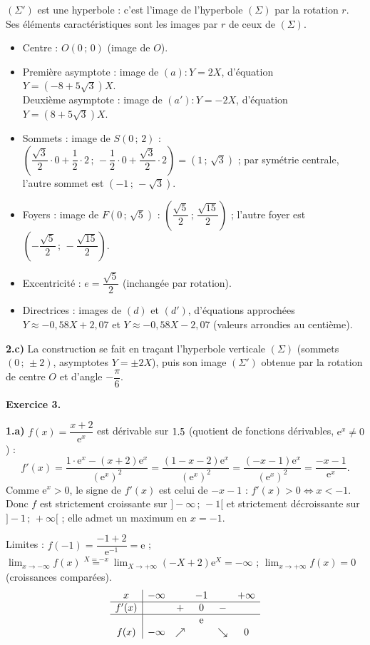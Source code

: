 \noindent$(\Sigma')$ est une hyperbole : c'est l'image de l'hyperbole $(\Sigma)$ par la rotation $r$. Ses éléments caractéristiques sont les images par $r$ de ceux de $(\Sigma)$.
\begin{itemize}
\item Centre : $O(0\,;\,0)$ (image de $O$).
\item Première asymptote : image de $(a):Y=2X$, d'équation $Y=(-8+5\sqrt3)X$.\\
Deuxième asymptote : image de $(a'):Y=-2X$, d'équation $Y=(8+5\sqrt3)X$.
\item Sommets : image de $S(0\,;\,2)$ : $\left(\dfrac{\sqrt3}{2}\cdot0+\dfrac12\cdot2\,;\,-\dfrac12\cdot0+\dfrac{\sqrt3}{2}\cdot2\right)=(1\,;\,\sqrt3)$ ; par symétrie centrale, l'autre sommet est $(-1\,;\,-\sqrt3)$.
\item Foyers : image de $F(0\,;\,\sqrt5)$ : $\left(\dfrac{\sqrt5}{2}\,;\,\dfrac{\sqrt{15}}{2}\right)$ ; l'autre foyer est $\left(-\dfrac{\sqrt5}{2}\,;\,-\dfrac{\sqrt{15}}{2}\right)$.
\item Excentricité : $e=\dfrac{\sqrt5}{2}$ (inchangée par rotation).
\item Directrices : images de $(d)$ et $(d')$, d'équations approchées $Y\approx-0{,}58X+2{,}07$ et $Y\approx-0{,}58X-2{,}07$ (valeurs arrondies au centième).
\end{itemize}

\noindent\textbf{2.c)} La construction se fait en traçant l'hyperbole verticale $(\Sigma)$ (sommets $(0\,;\,\pm2)$, asymptotes $Y=\pm2X$), puis son image $(\Sigma')$ obtenue par la rotation de centre $O$ et d'angle $-\dfrac{\pi}{6}$.

\bigskip
\noindent\textbf{Exercice 3.}

\smallskip
\noindent\textbf{1.a)} $f(x)=\dfrac{x+2}{\mathrm e^{x}}$ est dérivable sur $1.5$ (quotient de fonctions dérivables, $\mathrm e^{x}\neq0$) :
\[
f'(x)=\frac{1\cdot\mathrm e^{x}-(x+2)\mathrm e^{x}}{(\mathrm e^{x})^2}=\frac{(1-x-2)\mathrm e^{x}}{(\mathrm e^{x})^2}=\frac{(-x-1)\mathrm e^{x}}{(\mathrm e^{x})^2}=\frac{-x-1}{\mathrm e^{x}}.
\]
Comme $\mathrm e^{x}>0$, le signe de $f'(x)$ est celui de $-x-1$ : $f'(x)>0\iff x<-1$. Donc $f$ est strictement croissante sur $]-\infty\,;\,-1[$ et strictement décroissante sur $]-1\,;\,+\infty[$ ; elle admet un maximum en $x=-1$.

\noindent Limites : $f(-1)=\dfrac{-1+2}{\mathrm e^{-1}}=\mathrm e$ ; $\displaystyle\lim_{x\to-\infty}f(x)\overset{X=-x}{=}\lim_{X\to+\infty}(-X+2)\mathrm e^{X}=-\infty$ ; $\displaystyle\lim_{x\to+\infty}f(x)=0$ (croissances comparées).
\[
\begin{array}{c|ccccc}
x & -\infty & & -1 & & +\infty\\\hline
f'(x) & & + & 0 & - & \\\hline
& & & \mathrm e & &\\
f(x) & -\infty & \nearrow & & \searrow & 0
\end{array}
\]

